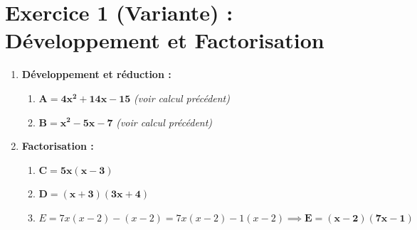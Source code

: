 \documentclass[12pt,a4paper]{article}
\begin{document}
\section*{Exercice 1 (Variante) : Développement et Factorisation}
\begin{enumerate}
    \item \textbf{Développement et réduction :}
    \begin{enumerate}
        \item $\mathbf{A = 4x^2 + 14x - 15}$ \textit{(voir calcul précédent)}
        \item $\mathbf{B = x^2 - 5x - 7}$ \textit{(voir calcul précédent)}
    \end{enumerate}
    \item \textbf{Factorisation :}
    \begin{enumerate}
        \item $\mathbf{C = 5x(x - 3)}$
        \item $\mathbf{D = (x + 3)(3x + 4)}$
        \item $E = 7x(x - 2) - (x - 2) = 7x(x - 2) - 1(x - 2) \implies \mathbf{E = (x - 2)(7x - 1)}$
    \end{enumerate}
\end{enumerate}
\end{document}
